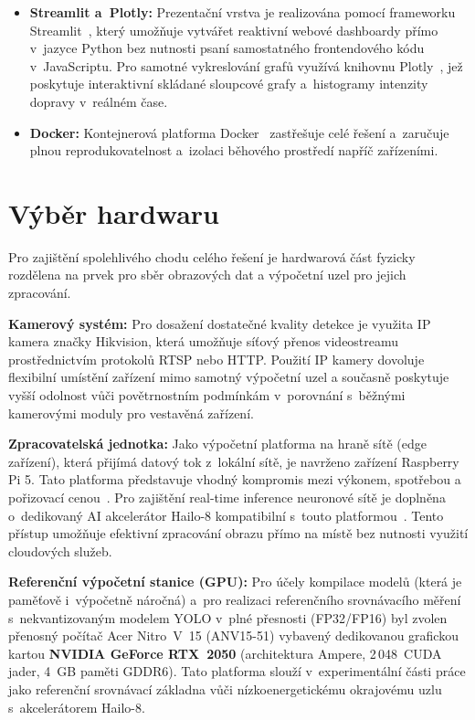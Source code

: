 \begin{itemize}
    \item \textbf{Streamlit a~Plotly:} Prezentační vrstva je realizována pomocí frameworku Streamlit~\cite{streamlit_docs}, který umožňuje vytvářet reaktivní webové dashboardy přímo v~jazyce Python bez nutnosti psaní samostatného frontendového kódu v~JavaScriptu. Pro samotné vykreslování grafů využívá knihovnu Plotly~\cite{plotly_docs_2015}, jež poskytuje interaktivní skládané sloupcové grafy a~histogramy intenzity dopravy v~reálném čase.
    \item \textbf{Docker:} Kontejnerová platforma Docker~\cite{docker_docs} zastřešuje celé řešení a~zaručuje plnou reprodukovatelnost a~izolaci běhového prostředí napříč zařízeními.
\end{itemize}

\section{Výběr hardwaru}
Pro zajištění spolehlivého chodu celého řešení je hardwarová část fyzicky rozdělena na prvek pro sběr obrazových dat a výpočetní uzel pro jejich zpracování.

\textbf{Kamerový systém:} Pro dosažení dostatečné kvality detekce je využita IP kamera značky Hikvision, která umožňuje síťový přenos videostreamu prostřednictvím protokolů \acs{RTSP} nebo \acs{HTTP}. Použití IP kamery dovoluje flexibilní umístění zařízení mimo samotný výpočetní uzel a současně poskytuje vyšší odolnost vůči povětrnostním podmínkám v~porovnání s~běžnými kamerovými moduly pro vestavěná zařízení. %

\textbf{Zpracovatelská jednotka:} Jako výpočetní platforma na hraně sítě (edge zařízení), která přijímá datový tok z~lokální sítě, je navrženo zařízení Raspberry Pi 5. Tato platforma představuje vhodný kompromis mezi výkonem, spotřebou a pořizovací cenou~\cite{raspberrypi_docs_2024}. Pro zajištění real-time inference neuronové sítě je doplněna o~dedikovaný AI akcelerátor Hailo-8 kompatibilní s~touto platformou~\cite{raspberrypi_ai_kit}. Tento přístup umožňuje efektivní zpracování obrazu přímo na místě bez nutnosti využití cloudových služeb.

\textbf{Referenční výpočetní stanice (\acs{GPU}):} Pro účely kompilace modelů (která je paměťově i~výpočetně náročná) a~pro realizaci referenčního srovnávacího měření s~nekvantizovaným modelem YOLO v~plné přesnosti (FP32/FP16) byl zvolen přenosný počítač Acer Nitro~V~15 (ANV15-51) vybavený dedikovanou grafickou kartou \textbf{NVIDIA GeForce RTX~2050} (architektura Ampere, 2\,048~CUDA jader, 4~GB paměti GDDR6). Tato platforma slouží v~experimentální části práce jako referenční srovnávací základna vůči nízkoenergetickému okrajovému uzlu s~akcelerátorem Hailo-8.


